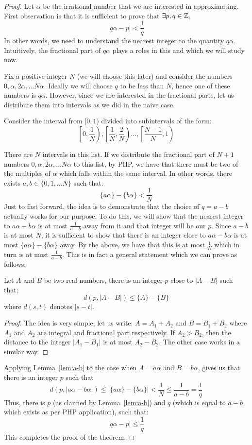 \begin{proof}
Let $\alpha$ be the irrational number that we are interested in approximating.
First observation is that it is sufficient to prove that $\exists p,q \in {\mathbb{Z}}$,
$$\left| q\alpha - p \right| < \frac{1}{q}$$
In other words, we need to understand the nearest integer to the quantity $q\alpha$. Intuitively, the fractional part of $q \alpha$ plays a roles in this and which we will study now.

Fix a positive integer $N$ (we will choose this later) and consider the numbers $0, \alpha, 2\alpha, \ldots N\alpha$. Ideally we will choose $q$ to be less than $N$, hence one of these numbers is $q \alpha$. However, since we are interested in the fractional parts, let us distribute them into intervals as we did in the naive case.

Consider the interval from $[0,1)$ divided into subintervals of the form:
$$ \left[\left.0,\frac{1}{N}\right.\right),\left[\left.\frac{1}{N},\frac{2}{N}\right.\right) \ldots ,\left[\left.\frac{N-1}{N},1\right.\right) $$

There are $N$ intervals in this list. If we distribute the fractional part of $N+1$ numbers $0, \alpha, 2\alpha, \ldots N\alpha$ to this list, by PHP, we have that there must be two of the multiples of $\alpha$ which falls within the same interval. In other words, there exists $a,b \in \{0,1, \ldots N\}$ such that:
$$ \{a\alpha\} - \{b \alpha\} < \frac{1}{N}$$
Just to fast forward, the idea is to demonstrate that the choice of $q = a-b$ actually works for our purpose. To do this, we will show that the nearest integer to $a \alpha  - b \alpha$ is at most $\frac{1}{a-b}$ away from it and that integer will be our $p$. Since $a-b$ is at most $N$, it is sufficient to show that there is an integer close to $a \alpha  - b \alpha$ is at most $\{a \alpha \} - \{b \alpha\}$ away. By the above, we have that this is at most $\frac{1}{N}$ which in turn is at most $\frac{1}{a-b}$. This is in fact a general statement which we can prove as follows:

\begin{lemma}
\label{lem:a-b}
Let $A$ and $B$ be two real numbers, there is  an integer $p$ close to $|A-B|$ such that:
$$d(p,|A-B|) \le \{A\} - \{B\} $$
where $d(s,t)$ denotes $|s-t|$.
\end{lemma}
\begin{proof}
The idea is very simple, let us write:
$A = A_1+A_2 \textrm{  and } B = B_1+B_2$
where $A_1$ and $A_2$ are integral and fractional part respectively. If $A_2 > B_2$, then the distance to the integer $|A_1 -B_1|$ is at most $A_2-B_2$. The other case works in a similar way.
\end{proof}

Applying Lemma~\ref{lem:a-b} to the case when $A = a\alpha$ and $B = b \alpha$, gives us that there is an integer $p$ such that 
$$d(p,|a\alpha - b\alpha|) \le |\{a\alpha\} - \{b\alpha\}| < \frac{1}{N} \le \frac{1}{a-b} = \frac{1}{q}$$
Thus, there is $p$ (as claimed by Lemma~\ref{lem:a-b}) and $q$ (which is equal to $a-b$ which exists as per PHP application), such that:
$$|q\alpha - p| \le \frac{1}{q}$$
This completes the proof of the theorem.
\end{proof}


